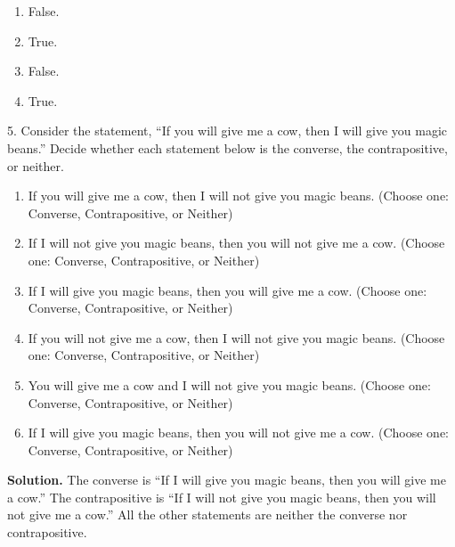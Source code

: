 \documentclass[10pt,]{book}
\theoremstyle{plain}
\theoremstyle{definition}
\theoremstyle{definition}
\numberwithin{equation}{chapter}
\begin{document}
\begin{exerciselist}
\par
\hypertarget{p-207}{}%
\leavevmode%
\begin{enumerate}[label=(\alph*)]
\item\hypertarget{li-101}{}\hypertarget{p-208}{}%
False.%
\item\hypertarget{li-102}{}\hypertarget{p-209}{}%
True.%
\item\hypertarget{li-103}{}\hypertarget{p-210}{}%
False.%
\item\hypertarget{li-104}{}\hypertarget{p-211}{}%
True.%
\end{enumerate}
%
\par
\item[5.]\hypertarget{exercise-5}{}\noindent%
\hypertarget{p-212}{}%
Consider the statement, ``If you will give me a cow, then I will give you magic beans.''  Decide whether each statement below is the converse, the contrapositive, or neither.%
\par
\hypertarget{p-213}{}%
\leavevmode%
\begin{enumerate}[label=(\alph*)]
\item\hypertarget{li-105}{}\hypertarget{p-214}{}%
If you will give me a cow, then I will not give you magic beans. (Choose one: Converse, Contrapositive, or Neither)%
\item\hypertarget{li-106}{}\hypertarget{p-215}{}%
If I will not give you magic beans, then you will not give me a cow. (Choose one: Converse, Contrapositive, or Neither)%
\item\hypertarget{li-107}{}\hypertarget{p-216}{}%
If I will give you magic beans, then you will give me a cow. (Choose one: Converse, Contrapositive, or Neither)%
\item\hypertarget{li-108}{}\hypertarget{p-217}{}%
If you will not give me a cow, then I will not give you magic beans. (Choose one: Converse, Contrapositive, or Neither)%
\item\hypertarget{li-109}{}\hypertarget{p-218}{}%
You will give me a cow and I will not give you magic beans. (Choose one: Converse, Contrapositive, or Neither)%
\item\hypertarget{li-110}{}\hypertarget{p-219}{}%
If I will give you magic beans, then you will not give me a cow. (Choose one: Converse, Contrapositive, or Neither)%
\end{enumerate}
%
\par
\medskip\noindent%
\textbf{Solution.}\quad \hypertarget{p-220}{}%
The converse is ``If I will give you magic beans, then you will give me a cow.''  The contrapositive is ``If I will not give you magic beans, then you will not give me a cow.''  All the other statements are neither the converse nor contrapositive.%

\end{exerciselist}
\end{document}
